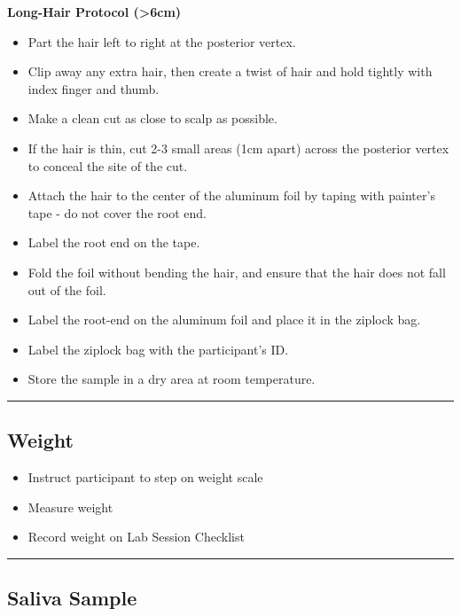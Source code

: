 \documentclass[]{book}
\providecommand{\tightlist}{%
  \setlength{\itemsep}{0pt}\setlength{\parskip}{0pt}}
\begin{document}
\textbf{Long-Hair Protocol (\textgreater{}6cm)}

\begin{itemize}
\tightlist
\item
  Part the hair left to right at the posterior vertex.
\item
  Clip away any extra hair, then create a twist of hair and hold tightly with index finger and thumb.
\item
  Make a clean cut as close to scalp as possible.
\item
  If the hair is thin, cut 2-3 small areas (1cm apart) across the posterior vertex to conceal the site of the cut.
\item
  Attach the hair to the center of the aluminum foil by taping with painter's tape - do not cover the root end.
\item
  Label the root end on the tape.
\item
  Fold the foil without bending the hair, and ensure that the hair does not fall out of the foil.
\item
  Label the root-end on the aluminum foil and place it in the ziplock bag.
\item
  Label the ziplock bag with the participant's ID.
\item
  Store the sample in a dry area at room temperature.
\end{itemize}

\begin{center}\rule{0.5\linewidth}{0.5pt}\end{center}

\hypertarget{weight}{%
\subsection{Weight}\label{weight}}

\begin{itemize}
\tightlist
\item
  Instruct participant to step on weight scale
\item
  Measure weight
\item
  Record weight on Lab Session Checklist
\end{itemize}

\begin{center}\rule{0.5\linewidth}{0.5pt}\end{center}

\hypertarget{saliva-sample}{%
\subsection{Saliva Sample}\label{saliva-sample}}
\end{document}
